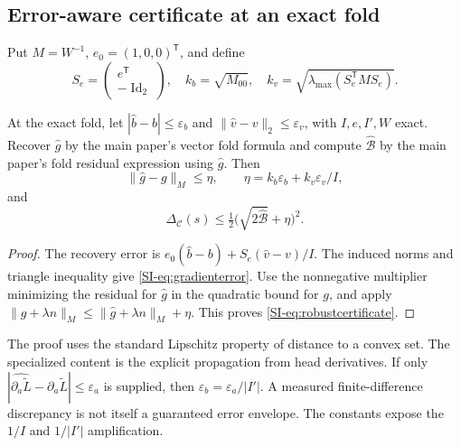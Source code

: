 \subsection{Error-aware certificate at an exact fold}
Put $M=W^{-1}$, $e_0=(1,0,0)^{\mathsf T}$, and define
\begin{equation}
 S_e=\begin{pmatrix}e^{\mathsf T}\\-\operatorname{Id}_2\end{pmatrix},\quad
 k_b=\sqrt{M_{00}},\quad k_v=\sqrt{\lambda_{\max}(S_e^{\mathsf T}MS_e)}.
 \label{SI-eq:errorconstants}
\end{equation}
\begin{proposition}
\label{SI-prop:robust}
At the exact fold, let $|\widehat b-b|\leq\varepsilon_b$ and $\|\widehat v-v\|_2\leq\varepsilon_v$, with $I,e,I',W$ exact. Recover $\widehat g$ by the main paper's vector fold formula and compute $\widehat{\mathcal B}$ by the main paper's fold residual expression using $\widehat g$. Then
\begin{equation}
 \|\widehat g-g\|_M\leq\eta,
 \qquad\eta=k_b\varepsilon_b+k_v\varepsilon_v/I,
 \label{SI-eq:gradienterror}
\end{equation}
and
\begin{equation}
 \Delta_{\mathcal C}(s)\leq
 \tfrac12\bigl(\sqrt{2\widehat{\mathcal B}}+\eta\bigr)^2.
 \label{SI-eq:robustcertificate}
\end{equation}
\end{proposition}
\begin{proof}
The recovery error is $e_0(\widehat b-b)+S_e(\widehat v-v)/I$. The induced norms and triangle inequality give \eqref{SI-eq:gradienterror}. Use the nonnegative multiplier minimizing the residual for $\widehat g$ in the quadratic bound for $g$, and apply $\|g+\lambda n\|_M\leq\|\widehat g+\lambda n\|_M+\eta$. This proves \eqref{SI-eq:robustcertificate}.
\end{proof}
The proof uses the standard Lipschitz property of distance to a convex set. The specialized content is the explicit propagation from head derivatives. If only $|\widehat{\partial_a\widetilde L}-\partial_a\widetilde L|\leq\varepsilon_a$ is supplied, then $\varepsilon_b=\varepsilon_a/|I'|$. A measured finite-difference discrepancy is not itself a guaranteed error envelope. The constants expose the $1/I$ and $1/|I'|$ amplification.


